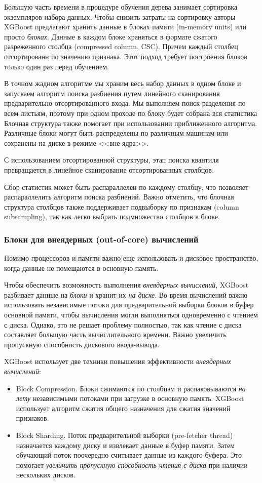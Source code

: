 \documentclass[%
	11pt,
	a4paper,
	utf8,
		]{article}
\begin{document}
Большую часть времени в процедуре обучения дерева занимает сортировка экземпляров набора данных. Чтобы снизить затраты на сортировку авторы XGBoost предлагают хранить данные в блоках памяти (in-memory units) или просто \emph{блоках}. Данные в каждом блоке храняться в формате сжатого разреженного столбца (compressed column, CSC). Причем каждый столбец отсортированн по значению признака. Этот подход требует построения блоков только один раз перед обучением.

В точном жадном алгоритме мы храним весь набор данных в одном блоке и запускаем алгоритм поиска разбиения путем линейного сканирования предварительно отсортированного входа. Мы выполняем поиск разделения по всем листьям, поэтому при одном проходе по блоку будет собрана вся статистика  Блочная структура также помогает при использовании приближенного алгоритма. Различные блоки могут быть распределены по различным машинам или сохранены на диске в режиме <<вне ядра>>.

С использованием отсортированной структуры, этап поиска квантиля превращается в линейное сканирование отсортированных столбцов.

Сбор статистик может быть распараллелен по каждому столбцу, что позволяет распараллелить алгоритм поиска разбиений. Важно отметить, что блочная структура столбцов также поддерживает подвыборку по признакам (column subsampling), так как легко выбрать подмножество столбцов в блоке.

\subsubsection{Блоки для внеядерных (out-of-core) вычислений}

Помимо процессоров и памяти важно еще использовать и дисковое пространство, когда данные не помещаются в основную память.

Чтобы обеспечить возможность выполнения \emph{внеядерных вычислений}, XGBoost разбивает данные на \emph{блоки} и хранит их \emph{на диске}. Во время вычислений важно использовать независимые потоки для предварительной выборки блоков в буфер основной памяти, чтобы вычисления могли выполняться одновременно с чтением с диска. Однако, это не решает проблему полностью, так как чтение с диска составляет большую часть вычислительного времени. Важно увеличить пропускную способность дискового ввода-вывода.

XGBoost использует две техники повышения эффективности \emph{внеядерных вычислений}:
\begin{itemize}
	\item Block Compression. Блоки сжимаются по столбцам и распаковываются \emph{на лету} независимыми потоками при загрузке в основную память. XGBoost использует алгоритм сжатия общего назначения для сжатия значений признаков. 
	
	\item Block Sharding. Поток предварительной выборки (pre-fetcher thread) назначается каждому диску и извлекает данные в буфер памяти. Затем обучающий поток поочередно считывает данные из каждого буфера. Это помогает \emph{увеличить пропускную способность чтения с диска} при наличии нескольких дисков.
\end{itemize}
\end{document}
